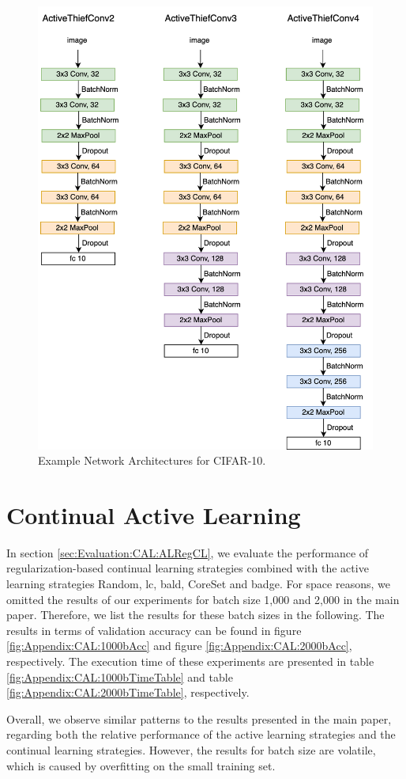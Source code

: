 \begin{figure}[!htb]
    \centering
    \includegraphics[width=\linewidth]{images/ActiveThiefConvs.png}
    \caption[ActiveThiefConv Architectures]{Example Network Architectures for CIFAR-10.}
    \label{fig:ActiveThiefArchitectures}
\end{figure}

\clearpage

\section{Continual Active Learning}
\label{sec:Appendix:ContinualActiveLearning}
In section \ref{sec:Evaluation:CAL:ALRegCL}, we evaluate the performance of regularization-based continual learning strategies combined with the active learning
strategies Random, \gls{lc}, \gls{bald}, CoreSet and \gls{badge}. For space reasons, we omitted the results of our experiments for batch size 1,000 and 2,000 in 
the main paper. Therefore, we list the results for these batch sizes in the following. The results in terms of validation accuracy can be found in figure
\ref{fig:Appendix:CAL:1000bAcc} and figure \ref{fig:Appendix:CAL:2000bAcc}, respectively. The execution time of these experiments are presented in table 
\ref{fig:Appendix:CAL:1000bTimeTable} and table \ref{fig:Appendix:CAL:2000bTimeTable}, respectively. \par
Overall, we observe similar patterns to the results presented in the main paper, regarding both the relative performance of the active learning strategies and
the continual learning strategies. However, the results for batch size are volatile, which is caused by overfitting on the small training set. 


